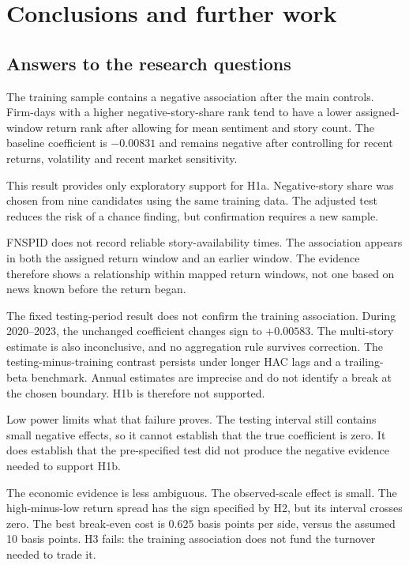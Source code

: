 \chapter{Conclusions and further work}
\label{ch:conclusion}

\section{Answers to the research questions}

The training sample contains a negative association after the main controls.
Firm-days with a higher negative-story-share rank tend to have a lower
assigned-window return rank after allowing for mean sentiment and story count.
The baseline coefficient is $-0.00831$ and remains negative after controlling
for recent returns, volatility and recent market sensitivity.

This result provides only exploratory support for H1a. Negative-story share was
chosen from nine candidates using the same training data. The adjusted test
reduces the risk of a chance finding, but confirmation requires a new sample.

FNSPID does not record reliable story-availability times. The association
appears in both the assigned return window and an earlier window. The evidence
therefore shows a relationship within mapped return windows, not one based on
news known before the return began.

The fixed testing-period result does not confirm the training association. During
2020--2023, the unchanged coefficient changes sign to $+0.00583$. The
multi-story estimate is also inconclusive, and no aggregation rule survives
correction. The testing-minus-training contrast persists under longer HAC lags
and a trailing-beta benchmark. Annual estimates are imprecise and do not identify
a break at the chosen boundary. H1b is therefore not supported.

Low power limits what that failure proves. The testing interval still contains
small negative effects, so it cannot establish that the true coefficient is
zero. It does establish that the pre-specified test did not produce the
negative evidence needed to support H1b.

The economic evidence is less ambiguous. The observed-scale effect is small.
The high-minus-low return spread has the sign specified by H2, but its interval
crosses zero. The best break-even cost is $0.625$ basis points per side, versus
the assumed 10 basis points. H3 fails: the training association does not fund
the turnover needed to trade it.

